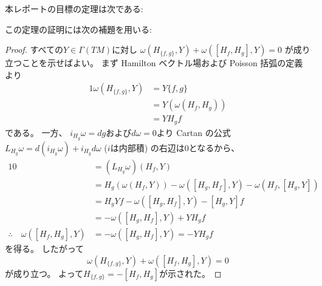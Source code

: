 \documentclass[report, notitlepage]{jlreq}
\begin{document}
本レポートの目標の定理は次である:


この定理の証明には次の補題を用いる:


\begin{proof}
    すべての$Y \in \Gamma(TM)$に対し
    $\omega(H_{\{f, g\}}, Y) + \omega([H_f, H_g], Y) = 0$
    が成り立つことを示せばよい。
    まず
    Hamilton ベクトル場および Poisson 括弧の定義より
    \begin{alignat}{1}
        \omega(H_{\{f, g\}}, Y)
            &=
                Y \{ f, g \}
                \\
            &=
                Y(\omega(H_f, H_g))
                \\
            &=
                Y H_g f
    \end{alignat}
    である。
    一方、
    $i_{H_g} \omega = dg$および$d\omega = 0$より
    Cartan の公式
    $L_{H_g} \omega = d(i_{H_g} \omega) + i_{H_g} d\omega$
    \; ($i$は内部積)
    の右辺は$0$となるから、
    \begin{alignat}{1}
        0
            &=
                (L_{H_g} \omega) (H_f, Y)
                \\
            &=
                H_g(\omega(H_f, Y)) - \omega([H_g, H_f], Y) - \omega(H_f, [H_g, Y])
                \\
            &=
                H_g Y f
                - \omega([H_g, H_f], Y)
                - [H_g, Y] f
                \\
            &=
                - \omega([H_g, H_f], Y)
                + Y H_g f
                \\
        \therefore \quad
        \omega([H_f, H_g], Y)
            &=
                - \omega([H_g, H_f], Y)
            =
                - Y H_g f
    \end{alignat}
    を得る。
    したがって
    \begin{equation}
        \omega(H_{\{f, g\}}, Y) + \omega([H_f, H_g], Y)
            = 0
    \end{equation}
    が成り立つ。
    よって$H_{\{f, g\}} = - [H_f, H_g]$が示された。
\end{proof}
\end{document}

